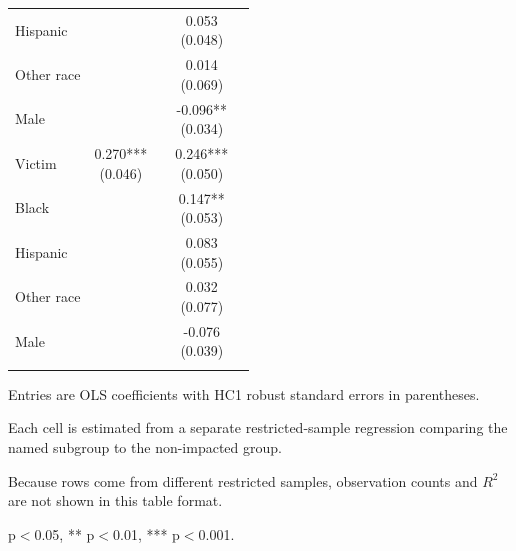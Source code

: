 \begin{table}[!htbp]
\begin{threeparttable}
\begin{tabular}{lcccc}
Hispanic &  &  & \makecell[c]{0.053 \\ (0.048)} &  \\
Other race &  &  & \makecell[c]{0.014 \\ (0.069)} &  \\
Male &  &  & \makecell[c]{-0.096** \\ (0.034)} &  \\
\addlinespace
Victim & \makecell[c]{0.270*** \\ (0.046)} &  & \makecell[c]{0.246*** \\ (0.050)} &  \\
Black &  &  & \makecell[c]{0.147** \\ (0.053)} &  \\
Hispanic &  &  & \makecell[c]{0.083 \\ (0.055)} &  \\
Other race &  &  & \makecell[c]{0.032 \\ (0.077)} &  \\
Male &  &  & \makecell[c]{-0.076 \\ (0.039)} &  \\
\addlinespace
\bottomrule
\end{tabular}
\begin{tablenotes}[flushleft]
\footnotesize
\item Entries are OLS coefficients with HC1 robust standard errors in parentheses.
\item Each cell is estimated from a separate restricted-sample regression comparing the named subgroup to the non-impacted group.
\item Because rows come from different restricted samples, observation counts and $R^2$ are not shown in this table format.
\item * p$<$0.05, ** p$<$0.01, *** p$<$0.001.
\end{tablenotes}
\end{threeparttable}
\end{table}
